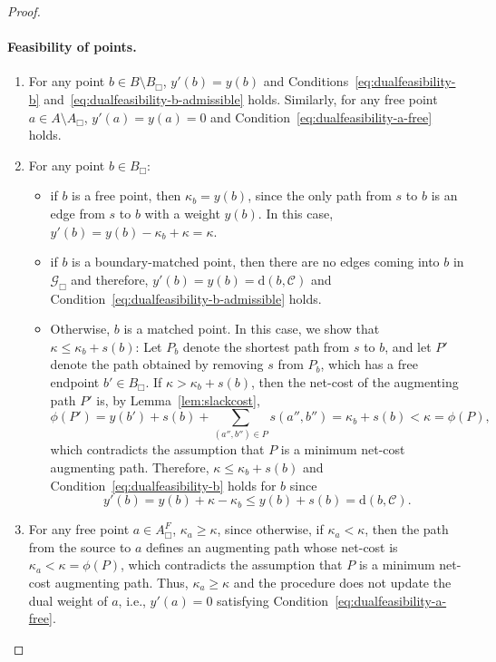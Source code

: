 \documentclass[11pt,onecolumn]{article}
\def\mcC{{\mathcal{C}}}
\def\mcG{{\mathcal{G}}}
\newcommand{\cell}{\Box}
\newcommand{\distancetocell}[2]{\mathrm{d}(#1, #2)}
\newcommand{\distance}[2]{\mathrm{d}(#1, #2)}
\newcommand\myparagraph[1]{\paragraph{#1}}
\begin{document}
\begin{proof}
    \myparagraph{Feasibility of points.}
    \begin{enumerate}
        \item For any point $b\in B\setminus B_\cell$, $y'(b)=y(b)$ and Conditions~\eqref{eq:dualfeasibility-b} and~\eqref{eq:dualfeasibility-b-admissible} holds. Similarly, for any free point $a\in A\setminus A_\cell$, $y'(a)=y(a)=0$ and Condition~\eqref{eq:dualfeasibility-a-free} holds.
        \item For any point $b\in B_\cell$:
        \begin{itemize}
            \item if $b$ is a free point, then $\kappa_b= y(b)$, since the only path from $s$ to $b$ is an edge from $s$ to $b$ with a weight $y(b)$. In this case, $y'(b)= y(b) -\kappa_b+\kappa=\kappa$.
            \item if $b$ is a boundary-matched point, then there are no edges coming into $b$ in $\mcG_\cell$ and therefore, $y'(b)=y(b)=\distance{b}{\mcC}$ and Condition~\eqref{eq:dualfeasibility-b-admissible} holds.
            \item Otherwise, $b$ is a matched point. In this case, we show that $\kappa\le \kappa_b+s(b)$: Let $P_b$ denote the shortest path from $s$ to $b$, and let $P'$ denote the path obtained by removing $s$ from $P_b$, which has a free endpoint $b'\in B_\cell$. If $\kappa> \kappa_b+s(b)$, then the net-cost of the augmenting path $P'$ is, by Lemma~\ref{lem:slackcost},
            \[\phi(P')=y(b')+s(b)+ \sum_{(a'',b'') \in P}s(a'',b'') = \kappa_b + s(b)< \kappa=\phi(P),\]
            which contradicts the assumption that $P$ is a minimum net-cost augmenting path. 
            Therefore, $\kappa\le \kappa_b+s(b)$ and Condition~\eqref{eq:dualfeasibility-b} holds for $b$ since 
            \begin{equation}
                y'(b) = y(b) + \kappa - \kappa_b \le y(b) + s(b) =\distancetocell{b}{\mcC}. 
            \end{equation}
        \end{itemize}
        \item For any free point $a\in A_\cell^F$, $\kappa_a\ge \kappa$, since otherwise, if $\kappa_a<\kappa$, then the path from the source to $a$ defines an augmenting path whose net-cost is $\kappa_a<\kappa=\phi(P)$, which contradicts the assumption that $P$ is a minimum net-cost augmenting path. Thus, $\kappa_a\ge \kappa$ and the procedure does not update the dual weight of $a$, i.e., $y'(a)=0$ satisfying Condition~\eqref{eq:dualfeasibility-a-free}. 
        

\end{enumerate}
\end{proof}
\end{document}
